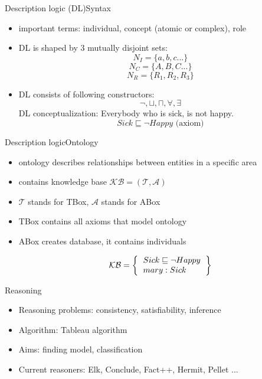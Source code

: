\documentclass{beamer}
\begin{document}
\begin{frame}{Description logic (DL)}{Syntax}
	\begin{itemize}
	\item {
		important terms: individual, concept (atomic or complex), role
	}
	\item {
		DL is shaped by 3 mutually disjoint sets:
		\[ N_{I} = \{ a,b,c... \} \]
		\[ N_{C} = \{ A,B,C... \} \]
		\[N_{R} = \{ R_{1}, R_{2}, R_{3} \} \]
	}
	\item {
		DL consists of following constructors:
		\[ \neg, \sqcup, \sqcap, \forall, \exists \]
		DL conceptualization: Everybody who is sick, is not happy.
		\[ Sick \sqsubseteq \neg Happy \text{ (axiom)} \]
	}
	\end{itemize}
\end{frame}

\begin{frame}{Description logic}{Ontology}
	\begin{itemize}
				
		\item {
			ontology describes relationships between entities in a specific area
		}
		
		\item {
			contains knowledge base $\mathcal{KB} = (\mathcal{T}, \mathcal{A})$	
		}
		
		\item {
			$\mathcal{T}$ stands for TBox, $\mathcal{A}$ stands for ABox
		}
		
		\item {
			TBox contains all axioms that model ontology
		}
		
		\item {
			ABox creates database, it contains individuals
		}
		
		\[ 
		\mathcal{KB} = \left\{
		\begin{tabular}{l c}
		$Sick \sqsubseteq \neg Happy$ \\
		$mary: Sick$ \\
		\end{tabular}
		\right \}
		\]

	\end{itemize}
\end{frame}

\begin{frame}{Reasoning}
	\begin{itemize}
		\item {
			Reasoning problems: consistency, satisfiability, inference
		}
		
		\item {
			Algorithm: Tableau algorithm
		}
		
		\item {
			Aims: finding model, classification
		}
		
		\item {
			Current reasoners: Elk, Conclude, Fact++, Hermit, Pellet ...
		}
	\end{itemize}
\end{frame}
\end{document}
